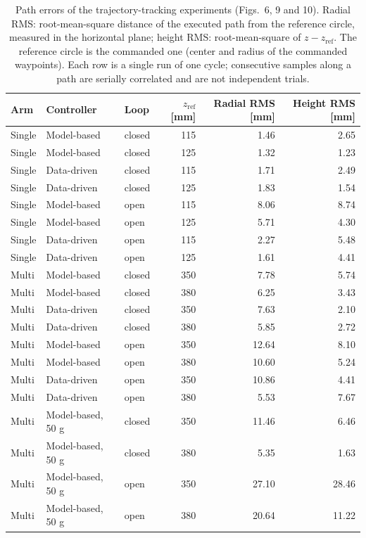 \begin{table}[h]
\centering
\caption{Path errors of the trajectory-tracking experiments (Figs.~6, 9 and 10). Radial RMS: root-mean-square distance of the executed path from the reference circle, measured in the horizontal plane; height RMS: root-mean-square of $z - z_{\mathrm{ref}}$. The reference circle is the commanded one (center and radius of the commanded waypoints). Each row is a single run of one cycle; consecutive samples along a path are serially correlated and are not independent trials.}
\label{tab:S7_paths}
\begin{tabular}{lllrrr}
\toprule
Arm & Controller & Loop & $z_{\mathrm{ref}}$ [mm] & Radial RMS [mm] & Height RMS [mm] \\
\midrule
Single & Model-based & closed & 115 & 1.46 & 2.65 \\
Single & Model-based & closed & 125 & 1.32 & 1.23 \\
Single & Data-driven & closed & 115 & 1.71 & 2.49 \\
Single & Data-driven & closed & 125 & 1.83 & 1.54 \\
Single & Model-based & open & 115 & 8.06 & 8.74 \\
Single & Model-based & open & 125 & 5.71 & 4.30 \\
Single & Data-driven & open & 115 & 2.27 & 5.48 \\
Single & Data-driven & open & 125 & 1.61 & 4.41 \\
\midrule
Multi & Model-based & closed & 350 & 7.78 & 5.74 \\
Multi & Model-based & closed & 380 & 6.25 & 3.43 \\
Multi & Data-driven & closed & 350 & 7.63 & 2.10 \\
Multi & Data-driven & closed & 380 & 5.85 & 2.72 \\
Multi & Model-based & open & 350 & 12.64 & 8.10 \\
Multi & Model-based & open & 380 & 10.60 & 5.24 \\
Multi & Data-driven & open & 350 & 10.86 & 4.41 \\
Multi & Data-driven & open & 380 & 5.53 & 7.67 \\
Multi & Model-based, 50 g & closed & 350 & 11.46 & 6.46 \\
Multi & Model-based, 50 g & closed & 380 & 5.35 & 1.63 \\
Multi & Model-based, 50 g & open & 350 & 27.10 & 28.46 \\
Multi & Model-based, 50 g & open & 380 & 20.64 & 11.22 \\
\bottomrule
\end{tabular}
\end{table}
